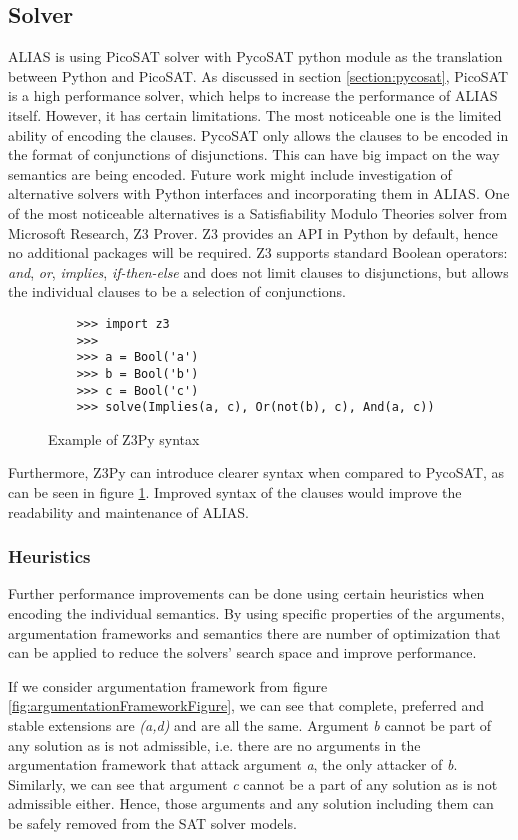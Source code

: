 

\subsection{Solver}

ALIAS is using PicoSAT solver with PycoSAT python module as the translation between Python and PicoSAT. As discussed in section \ref{section:pycosat}, PicoSAT is a high performance solver, which helps to increase the performance of ALIAS itself. However, it has certain limitations. The most noticeable one is the limited ability of encoding the clauses. PycoSAT only allows the clauses to be encoded in the format of conjunctions of disjunctions. This can have big impact on the way semantics are being encoded. Future work might include investigation of alternative solvers with Python interfaces and incorporating them in ALIAS. One of the most noticeable alternatives is a Satisfiability Modulo Theories solver from Microsoft Research, Z3 Prover. Z3 provides an API in Python by default, hence no additional packages will be required. Z3 supports standard Boolean operators: \textit{and}, \textit{or}, \textit{implies}, \textit{if-then-else} and does not limit clauses to disjunctions, but allows the individual clauses to be a selection of conjunctions. 

\begin{figure}
	\begin{verbatim}
	>>> import z3
	>>>
	>>> a = Bool('a')
	>>> b = Bool('b')
	>>> c = Bool('c')
	>>> solve(Implies(a, c), Or(not(b), c), And(a, c))
	\end{verbatim}
	\caption{Example of Z3Py syntax}
	\label{fig:z3}
\end{figure}

Furthermore, Z3Py can introduce clearer syntax when compared to PycoSAT, as can be seen in figure \ref{fig:z3}. Improved syntax of the clauses would improve the readability and maintenance of ALIAS. 

\subsubsection{Heuristics}
Further performance improvements can be done using certain heuristics when encoding the individual semantics. By using specific properties of the arguments, argumentation frameworks and semantics there are number of optimization that can be applied to reduce the solvers' search space and improve performance.

If we consider argumentation framework from figure \ref{fig:argumentationFrameworkFigure}, we can see that complete, preferred and stable extensions are \textit{(a,d)} and are all the same. Argument \textit{b} cannot be part of any solution as is not admissible, i.e. there are no arguments in the argumentation framework that attack argument \textit{a}, the only attacker of \textit{b}. Similarly, we can see that argument \textit{c} cannot be a part of any solution as is not admissible either. Hence, those arguments and any solution including them can be safely removed from the SAT solver models. 

